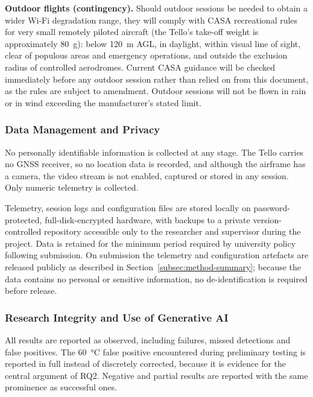 \noindent\textbf{Outdoor flights (contingency).} Should outdoor sessions be
needed to obtain a wider Wi-Fi degradation range, they will comply with CASA
recreational rules for very small remotely piloted aircraft (the Tello's take-off
weight is approximately \SI{80}{\gram}): below \SI{120}{\metre} AGL, in daylight,
within visual line of sight, clear of populous areas and emergency operations,
and outside the exclusion radius of controlled aerodromes. Current CASA guidance
will be checked immediately before any outdoor session rather than relied on from
this document, as the rules are subject to amendment. Outdoor sessions will not
be flown in rain or in wind exceeding the manufacturer's stated limit.

\subsubsection{Data Management and Privacy}

No personally identifiable information is collected at any stage. The Tello
carries no GNSS receiver, so no location data is recorded, and although the
airframe has a camera, the video stream is not enabled, captured or stored in any
session. Only numeric telemetry is collected.

Telemetry, session logs and configuration files are stored locally on
password-protected, full-disk-encrypted hardware, with backups to a private
version-controlled repository accessible only to the researcher and supervisor
during the project. Data is retained for the minimum period required by
university policy following submission. On submission the telemetry and
configuration artefacts are released publicly as described in
Section~\ref{subsec:method-summary}; because the data contains no personal or
sensitive information, no de-identification is required before release.

\subsubsection{Research Integrity and Use of Generative AI}

All results are reported as observed, including failures, missed detections and
false positives. The \SI{60}{\celsius} false positive encountered during
preliminary testing is reported in full instead of discretely corrected, because
it is evidence for the central argument of RQ2. Negative and partial results are
reported with the same prominence as successful ones.

